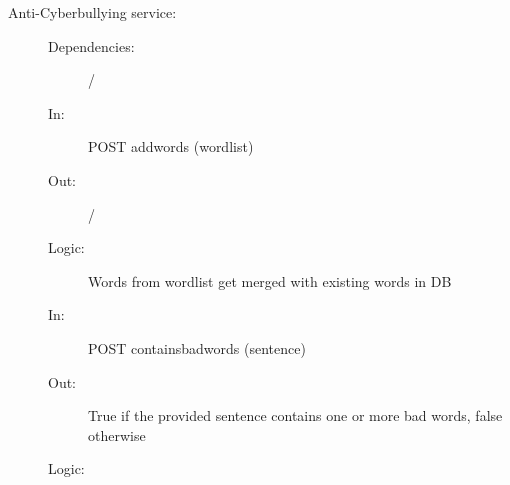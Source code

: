 \documentclass{article}
\begin{document}
\begin{description}
    \item [Anti-Cyberbullying service:]
    \begin{description}
        \item[]
        \item[Dependencies:] /
    \end{description}
    \begin{description}
        \item[]
        \item[In:] POST addwords (wordlist)
        \item[Out:] /
        \item[Logic:] Words from wordlist get merged with existing words in DB
        \item[]
        
        \item[In:] POST containsbadwords (sentence)
        \item[Out:] True if the provided sentence contains one or more bad words, false otherwise
        \item[Logic:] 
    \end{description}
\end{description}
\end{document}
